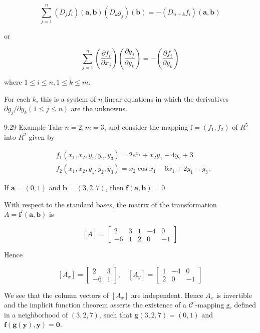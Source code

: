 \documentclass[10pt]{article}
\begin{document}
$$
\sum_{j=1}^{n}\left(D_{j} f_{i}\right)(\mathbf{a}, \mathbf{b})\left(D_{k} g_{j}\right)(\mathbf{b})=-\left(D_{n+k} f_{i}\right)(\mathbf{a}, \mathbf{b})
$$

or

$$
\sum_{j=1}^{n}\left(\frac{\partial f_{i}}{\partial x_{j}}\right)\left(\frac{\partial g_{j}}{\partial y_{k}}\right)=-\left(\frac{\partial f_{i}}{\partial y_{k}}\right)
$$

where $1 \leq i \leq n, 1 \leq k \leq m$.

For each $k$, this is a system of $n$ linear equations in which the derivatives $\partial g_{j} / \partial y_{k}(1 \leq j \leq n)$ are the unknowns.

9.29 Example Take $n=2, m=3$, and consider the mapping $\mathrm{f}=\left(f_{1}, f_{2}\right)$ of $R^{5}$ into $R^{2}$ given by

$$
\begin{aligned}
& f_{1}\left(x_{1}, x_{2}, y_{1}, y_{2}, y_{3}\right)=2 e^{x_{1}}+x_{2} y_{1}-4 y_{2}+3 \\
& f_{2}\left(x_{1}, x_{2}, y_{1}, y_{2}, y_{3}\right)=x_{2} \cos x_{1}-6 x_{1}+2 y_{1}-y_{3} .
\end{aligned}
$$

If $\mathbf{a}=(0,1)$ and $\mathbf{b}=(3,2,7)$, then $\mathbf{f}(\mathbf{a}, \mathbf{b})=0$.

With respect to the standard bases, the matrix of the transformation $A=\mathbf{f}^{\prime}(\mathbf{a}, \mathbf{b})$ is

$$
[A]=\left[\begin{array}{rrrrr}
2 & 3 & 1 & -4 & 0 \\
-6 & 1 & 2 & 0 & -1
\end{array}\right]
$$

Hence

$$
\left[A_{x}\right]=\left[\begin{array}{rr}
2 & 3 \\
-6 & 1
\end{array}\right], \quad\left[A_{y}\right]=\left[\begin{array}{rrr}
1 & -4 & 0 \\
2 & 0 & -1
\end{array}\right]
$$

We see that the column vectors of $\left[A_{x}\right]$ are independent. Hence $A_{x}$ is invertible and the implicit function theorem asserts the existence of a $\mathscr{C}^{\prime}$-mapping $\mathrm{g}$, defined in a neighborhood of $(3,2,7)$, such that $\mathbf{g}(3,2,7)=(0,1)$ and $\mathbf{f}(\mathbf{g}(\mathbf{y}), \mathbf{y})=\mathbf{0}$.
\end{document}
